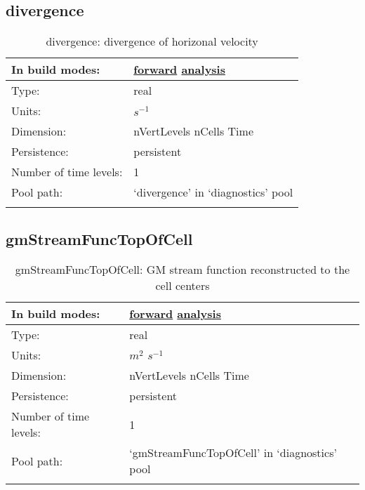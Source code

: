 \subsection[divergence]{divergence}
\label{subsec:var_sec_diagnostics_divergence}
\begin{center}
\begin{longtable}{| p{2.0in} | p{4.0in} |}
        \hline 
        In build modes: & \hyperref[subsec:forward_var_tab_diagnostics]{forward} \hyperref[subsec:analysis_var_tab_diagnostics]{analysis} \\
        \hline 
        Type: & real \\
        \hline 
        Units: & $s^{-1}$ \\
        \hline 
        Dimension: & nVertLevels nCells Time \\
        \hline 
        Persistence: & persistent \\
        \hline 
        Number of time levels: & 1 \\
        \hline 
            Pool path: & `divergence' in `diagnostics' pool \\
		 \hline 
    \caption{divergence: divergence of horizonal velocity}
\end{longtable}
\end{center}
\subsection[gmStreamFuncTopOfCell]{gmStreamFuncTopOfCell}
\label{subsec:var_sec_diagnostics_gmStreamFuncTopOfCell}
\begin{center}
\begin{longtable}{| p{2.0in} | p{4.0in} |}
        \hline 
        In build modes: & \hyperref[subsec:forward_var_tab_diagnostics]{forward} \hyperref[subsec:analysis_var_tab_diagnostics]{analysis} \\
        \hline 
        Type: & real \\
        \hline 
        Units: & $m^2$ $s^{-1}$ \\
        \hline 
        Dimension: & nVertLevels nCells Time \\
        \hline 
        Persistence: & persistent \\
        \hline 
        Number of time levels: & 1 \\
        \hline 
            Pool path: & `gmStreamFuncTopOfCell' in `diagnostics' pool \\
		 \hline 
    \caption{gmStreamFuncTopOfCell: GM stream function reconstructed to the cell centers}
\end{longtable}
\end{center}
